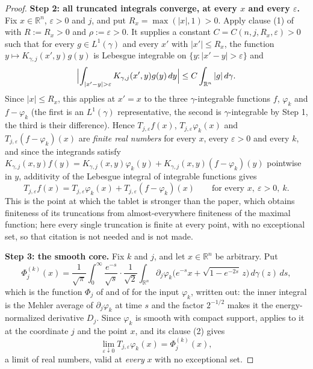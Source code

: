 \begin{proof}
\medskip
\noindent\textbf{Step 2: all truncated integrals converge, at every $x$ and
every $\varepsilon$.}
Fix $x \in \mathbb{R}^n$, $\varepsilon > 0$ and $j$, and put
$R_x = \max(|x|,1) > 0$.  Apply clause (1) of
 with $R := R_x > 0$ and
$\rho := \varepsilon > 0$.  It supplies a constant
$C = C(n,j,R_x,\varepsilon) > 0$ such that for every
$g \in L^1(\gamma)$ and every $x'$ with $|x'| \leq R_x$, the function
$y \mapsto K_{\gamma,j}(x',y)g(y)$ is Lebesgue integrable on
$\{y : |x'-y| > \varepsilon\}$ and
\begin{equation}\label{eq:pvid-far}
  \Bigl|\int_{|x'-y|>\varepsilon}K_{\gamma,j}(x',y)g(y)\,dy\Bigr|
    \leq C\int_{\mathbb{R}^n}|g|\,d\gamma .
\end{equation}
Since $|x| \leq R_x$, this applies at $x' = x$ to the three $\gamma$-integrable
functions $f$, $\varphi_k$ and $f - \varphi_k$ (the first is an $L^1(\gamma)$
representative, the second is $\gamma$-integrable by Step 1, the third is
their difference).  Hence $T_{j,\varepsilon}f(x)$,
$T_{j,\varepsilon}\varphi_k(x)$ and $T_{j,\varepsilon}(f-\varphi_k)(x)$ are
\emph{finite real numbers} for every $x$, every $\varepsilon > 0$ and every
$k$, and since the integrands satisfy
$K_{\gamma,j}(x,y)f(y) = K_{\gamma,j}(x,y)\varphi_k(y)
  + K_{\gamma,j}(x,y)(f-\varphi_k)(y)$ pointwise in $y$, additivity of the
Lebesgue integral of integrable functions gives
\begin{equation}\label{eq:pvid-split}
  T_{j,\varepsilon}f(x) = T_{j,\varepsilon}\varphi_k(x)
     + T_{j,\varepsilon}(f-\varphi_k)(x)
  \qquad\text{for every } x,\ \varepsilon > 0,\ k .
\end{equation}
This is the point at which the tablet is stronger than the paper, which
obtains finiteness of its truncations from almost-everywhere finiteness of the
maximal function; here every single truncation is finite at every point, with
no exceptional set, so that citation is not needed and is not made.

\medskip
\noindent\textbf{Step 3: the smooth core.}
Fix $k$ and $j$, and let $x \in \mathbb{R}^n$ be arbitrary.  Put
\[
  \Phi^{(k)}_j(x) = \frac1{\sqrt\pi}\int_0^\infty
     \frac{e^{-s}}{\sqrt s}\cdot\frac1{\sqrt2}
     \int_{\mathbb{R}^n}
       \partial_j\varphi_k\bigl(e^{-s}x + \sqrt{1-e^{-2s}}\,z\bigr)
     \,d\gamma(z)\,ds ,
\]
which is the function $\Phi_j$ of  and of
 for the input $\varphi_k$, written out: the
inner integral is the Mehler average of $\partial_j\varphi_k$ at time $s$ and
the factor $2^{-1/2}$ makes it the energy-normalized derivative $D_j$.  Since
$\varphi_k$ is smooth with compact support,  applies to
it at the coordinate $j$ and the point $x$, and its clause (2) gives
\begin{equation}\label{eq:pvid-core}
  \lim_{\varepsilon\downarrow0}T_{j,\varepsilon}\varphi_k(x)
    = \Phi^{(k)}_j(x) ,
\end{equation}
a limit of real numbers, valid at \emph{every} $x$ with no exceptional set.


\end{proof}
